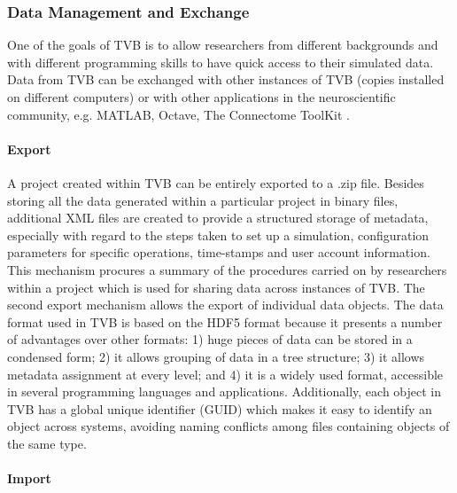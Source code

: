 \documentclass{bioinfo}
\begin{document}
\begin{methods}
    \subsubsection{Data Management and Exchange}
    
    One of the goals of TVB is to allow researchers from different backgrounds 
    and with different programming skills to have quick access to their 
    simulated data. Data from TVB can be exchanged with other instances of TVB
    (copies installed on different computers) or with other applications in the 
    neuroscientific community, e.g. MATLAB, Octave, The Connectome ToolKit 
    \citep{Gerhard_2011}. 
    
    \paragraph*{Export} A project created within TVB can be entirely exported 
    to a .zip file. Besides storing all the data generated within a particular
    project in binary files, additional XML files are created to provide a 
    structured storage of metadata, especially with regard to the steps taken 
    to set up a simulation, configuration parameters for specific operations,
    time-stamps and user account information. This mechanism procures a summary
    of the procedures carried on by researchers within a project which is used
    for sharing data across instances of TVB. The second export mechanism 
    allows the export of individual data objects. The data format used in TVB 
    is based on the HDF5 format  \citep{HDF5} because it presents a number of advantages over 
    other formats: 
        1) huge pieces of data can be stored in a condensed form; 
        2) it allows grouping of data in a tree structure;
        3) it allows metadata assignment at every level; and 
        4) it is a widely used format, accessible in several programming 
        languages and applications.
    Additionally, each object in TVB has a global unique identifier (GUID) 
    which makes it easy to identify an object across systems, avoiding naming 
    conflicts among files containing objects of the same type.
    
    \paragraph*{Import}
    

\end{methods}
\end{document}
